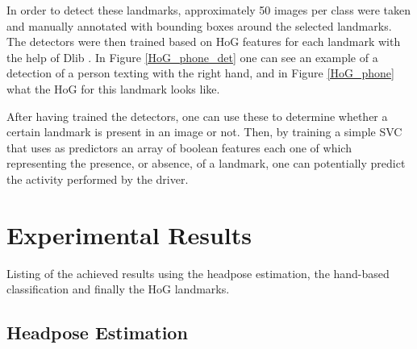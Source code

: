\documentclass[10pt,twocolumn,letterpaper]{article}
\begin{document}
In order to detect these landmarks, approximately 50 images per class were taken and manually annotated with bounding boxes around the selected landmarks. The detectors were then trained based on HoG features for each landmark with the help of Dlib \cite{dlib09}. In Figure \ref{HoG_phone_det} one can see an example of a detection of a person texting with the right hand, and in Figure \ref{HoG_phone} what the HoG for this landmark looks like.

After having trained the detectors, one can use these to determine whether a certain landmark is present in an image or not. Then, by training a simple SVC that uses as predictors an array of boolean features each one of which representing the presence, or absence, of a landmark, one can potentially predict the activity performed by the driver.






\section{Experimental Results}
Listing of the achieved results using the headpose estimation, the hand-based classification and finally the HoG landmarks.
\subsection{Headpose Estimation}
\end{document}
